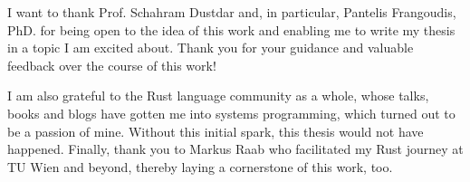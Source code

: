 \documentclass[draft, final, x11names, svgnames]{template/vutinfth} %
\begin{document}
\frontmatter %

\addstatementpage

\begin{acknowledgements*}
I want to thank Prof. Schahram Dustdar and, in particular, Pantelis Frangoudis, PhD. for being open to the idea of this work and enabling me to write my thesis in a topic I am excited about. Thank you for your guidance and valuable feedback over the course of this work!

I am also grateful to the Rust language community as a whole, whose talks, books and blogs have gotten me into systems programming, which turned out to be a passion of mine. Without this initial spark, this thesis would not have happened. Finally, thank you to Markus Raab who facilitated my Rust journey at TU Wien and beyond, thereby laying a cornerstone of this work, too.
\end{acknowledgements*}
\end{document}
